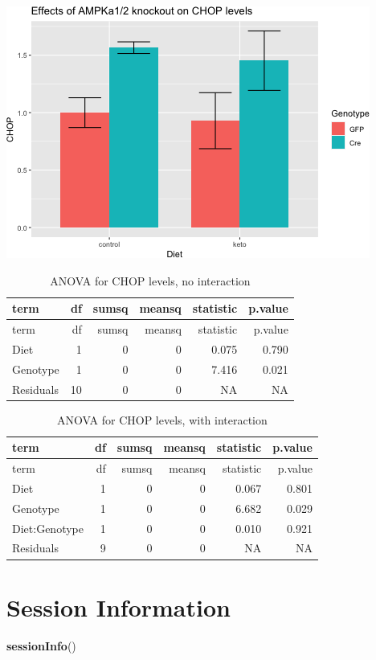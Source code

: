 \documentclass[]{article}
\newenvironment{Shaded}{\begin{snugshade}}{\end{snugshade}}
\newcommand{\KeywordTok}[1]{\textcolor[rgb]{0.13,0.29,0.53}{\textbf{#1}}}
\newcommand{\NormalTok}[1]{#1}
\begin{document}
\includegraphics{figures/chop-barplot-1.png}

\begin{longtable}[]{@{}lrrrrr@{}}
\caption{ANOVA for CHOP levels, no interaction}\tabularnewline
\toprule
term & df & sumsq & meansq & statistic & p.value\tabularnewline
\midrule
\endfirsthead
\toprule
term & df & sumsq & meansq & statistic & p.value\tabularnewline
\midrule
\endhead
Diet & 1 & 0 & 0 & 0.075 & 0.790\tabularnewline
Genotype & 1 & 0 & 0 & 7.416 & 0.021\tabularnewline
Residuals & 10 & 0 & 0 & NA & NA\tabularnewline
\bottomrule
\end{longtable}

\begin{longtable}[]{@{}lrrrrr@{}}
\caption{ANOVA for CHOP levels, with interaction}\tabularnewline
\toprule
term & df & sumsq & meansq & statistic & p.value\tabularnewline
\midrule
\endfirsthead
\toprule
term & df & sumsq & meansq & statistic & p.value\tabularnewline
\midrule
\endhead
Diet & 1 & 0 & 0 & 0.067 & 0.801\tabularnewline
Genotype & 1 & 0 & 0 & 6.682 & 0.029\tabularnewline
Diet:Genotype & 1 & 0 & 0 & 0.010 & 0.921\tabularnewline
Residuals & 9 & 0 & 0 & NA & NA\tabularnewline
\bottomrule
\end{longtable}

\hypertarget{session-information}{%
\section{Session Information}\label{session-information}}

\begin{Shaded}
\begin{Highlighting}[]
\KeywordTok{sessionInfo}\NormalTok{()}
\end{Highlighting}
\end{Shaded}
\end{document}
